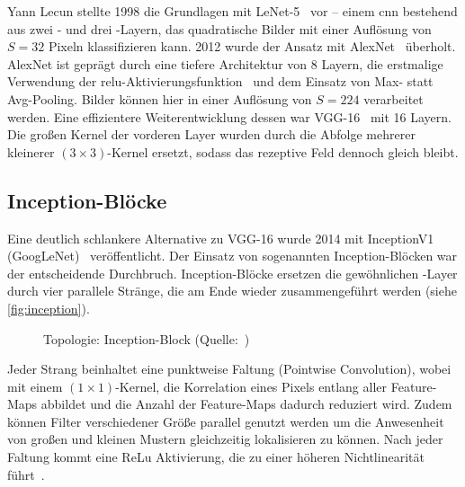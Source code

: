 Yann Lecun stellte 1998 die Grundlagen mit LeNet-5~\cite{Lecun98} vor -- einem \gls{cnn} bestehend aus zwei \conv- und drei \fc-Layern, das quadratische Bilder mit einer Auflösung von $S=32$ Pixeln klassifizieren kann.
2012 wurde der Ansatz mit AlexNet~\cite{Krizhevsky12} überholt.
AlexNet ist geprägt durch eine tiefere Architektur von 8 Layern, die erstmalige Verwendung der \gls{relu}-Aktivierungsfunktion~\cite{jarrett09} und dem Einsatz von Max- statt Avg-Pooling.
Bilder können hier in einer Auflösung von $S=224$ verarbeitet werden.
Eine effizientere Weiterentwicklung dessen war VGG-16~\cite{Simonyan15} mit 16 Layern.
Die großen Kernel der vorderen Layer wurden durch die Abfolge mehrerer kleinerer $(3 \times 3)$-Kernel ersetzt, sodass das rezeptive Feld dennoch gleich bleibt.


\subsection{Inception-Blöcke}
\label{subsec:inception-bloecke}

Eine deutlich schlankere Alternative zu VGG-16 wurde 2014 mit InceptionV1 (GoogLeNet)~\cite{Szegedy14} veröffentlicht.
Der Einsatz von sogenannten Inception-Blöcken war der entscheidende Durchbruch.
Inception-Blöcke ersetzen die gewöhnlichen \conv-Layer durch vier parallele Stränge, die am Ende wieder zusammengeführt werden (siehe \autoref{fig:inception}).

\begin{figure}[hb!]
    \centering
    \caption{Topologie: Inception-Block (Quelle:~\cite{Karim19})}
    \label{fig:inception}
\end{figure}

Jeder Strang beinhaltet eine punktweise Faltung (Pointwise Convolution), wobei mit einem $(1 \times 1)$-Kernel, die Korrelation eines Pixels entlang aller Feature-Maps abbildet und die Anzahl der Feature-Maps dadurch reduziert wird.
Zudem können Filter verschiedener Größe parallel genutzt werden um die Anwesenheit von großen und kleinen Mustern gleichzeitig lokalisieren zu können.
Nach jeder Faltung kommt eine ReLu Aktivierung, die zu einer höheren Nichtlinearität führt~\cite{Pointer19}.

